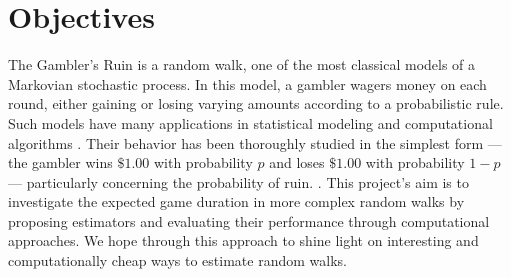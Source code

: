 \documentclass[a4paper,10pt,twocolumn]{article}
\begin{document}
\pagestyle{fancy}
\fancyhead{}
\renewcommand{\headrulewidth}{0pt}


\section{Objectives}

The Gambler’s Ruin is a random walk, one of the most classical models of a
Markovian stochastic process. In this model, a gambler wagers money on each
round, either gaining or losing varying amounts according to a probabilistic
rule. Such models have many applications in statistical modeling and
computational algorithms \cite{ross_markov_2019}. Their behavior has been
thoroughly studied in the simplest form — the gambler wins $\$1.00$
with probability $p$ and loses $\$1.00$ with probability $1-p$ —
particularly concerning the probability of ruin.
\cite{ross_introduction_2019}. This project's aim is to investigate the
expected game duration in more complex random walks by proposing estimators
and evaluating their performance through computational approaches.
We hope through this approach to shine light on interesting and computationally
cheap ways to estimate random walks.
\end{document}
